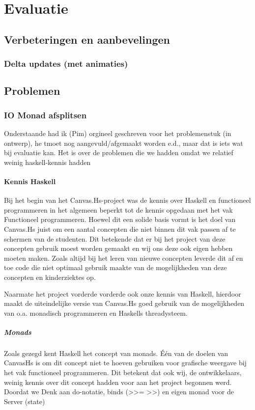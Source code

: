 \chapter{Evaluatie} \label{hoofdstuk:evaluatie}
\section{Verbeteringen en aanbevelingen}
\subsection{Delta updates (met animaties)}

\section{Problemen}
\subsection{IO Monad afsplitsen}

{\color{red} Onderstaande had ik (Pim) orgineel geschreven voor het problemenstuk (in ontwerp), he tmoet nog aangevuld/afgemaakt worden e.d., maar dat is iets wat bij evaluatie kan. Het is over de problemen die we hadden omdat we relatief weinig haskell-kennis hadden}

\subsubsection{Kennis Haskell}
Bij het begin van het Canvas.Hs-project was de kennis over Haskell en functioneel programmeren in het algemeen beperkt tot de kennis opgedaan met het vak Functioneel programmeren. Hoewel dit een solide basis vormt is het doel van Canvas.Hs juist om een aantal concepten die niet binnen dit vak passen af te schermen van de studenten. Dit betekende dat er bij het project van deze concepten gebruik moest worden gemaakt en wij ons deze ook eigen hebben moeten maken. Zoals altijd bij het leren van nieuwe concepten leverde dit af en toe code die niet optimaal gebruik maakte van de mogelijkheden van deze concepten en kinderziektes op. 

Naarmate het project vorderde vorderde ook onze kennis van Haskell, hierdoor maakt de uiteindelijke versie van Canvas.Hs goed gebruik van de mogelijkheden van o.a. monadisch programmeren en Haskells threadysteem. 
\paragraph{Monads}
Zoals gezegd kent Haskell het concept van monads. Één van de doelen van CanvasHs is om dit concept niet te hoeven gebruiken voor grafische weergave bij het vak functioneel programmeren. Dit betekent dat ook wij, de ontwikkelaars, weinig kennis over dit concept hadden voor aan het project begonnen werd. Doordat we 
Denk aan do-notatie, binds (>>=
>>) en eigen monad voor de Server (state)


